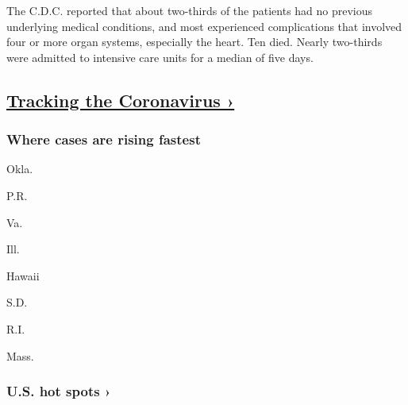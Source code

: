 The C.D.C. reported that about two-thirds of the patients had no
previous underlying medical conditions, and most experienced
complications that involved four or more organ systems, especially the
heart. Ten died. Nearly two-thirds were admitted to intensive care units
for a median of five days.

\hypertarget{tracking-the-coronavirus-}{%
\subsection{\texorpdfstring{\href{https://www.nytimes.com/interactive/2020/us/coronavirus-us-cases.html}{Tracking
the Coronavirus
›}}{Tracking the Coronavirus ›}}\label{tracking-the-coronavirus-}}

\href{https://www.nytimes.com/interactive/2020/us/coronavirus-us-cases.html}{}

\hypertarget{where-cases-are-rising-fastest}{%
\subsubsection{\texorpdfstring{Where cases are \textbf{rising}
fastest}{Where cases are rising fastest}}\label{where-cases-are-rising-fastest}}

\href{https://www.nytimes.com/interactive/2020/us/oklahoma-coronavirus-cases.html}{}

Okla.
\href{https://www.nytimes.com/interactive/2020/us/puerto-rico-coronavirus-cases.html}{}

P.R.
\href{https://www.nytimes.com/interactive/2020/us/virginia-coronavirus-cases.html}{}

Va.
\href{https://www.nytimes.com/interactive/2020/us/illinois-coronavirus-cases.html}{}

Ill.
\href{https://www.nytimes.com/interactive/2020/us/hawaii-coronavirus-cases.html}{}

Hawaii
\href{https://www.nytimes.com/interactive/2020/us/south-dakota-coronavirus-cases.html}{}

S.D.
\href{https://www.nytimes.com/interactive/2020/us/rhode-island-coronavirus-cases.html}{}

R.I.
\href{https://www.nytimes.com/interactive/2020/us/massachusetts-coronavirus-cases.html}{}

Mass.

\href{https://www.nytimes.com/interactive/2020/us/coronavirus-us-cases.html}{}

\hypertarget{us-hot-spots-}{%
\subsubsection{U.S. hot spots ›}\label{us-hot-spots-}}


